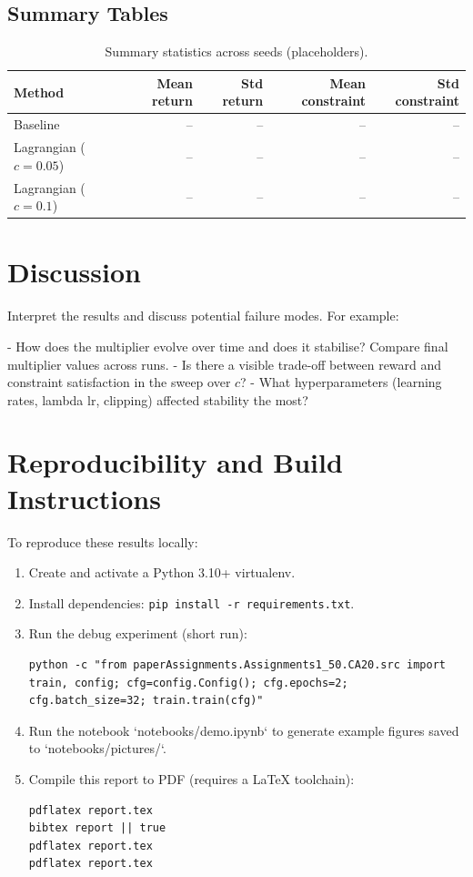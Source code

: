 \subsection{Summary Tables}
\begin{table}[h]
  \centering
  \begin{tabular}{lrrrr}
    \hline
    Method & Mean return & Std return & Mean constraint & Std constraint\\
    \hline
    Baseline & -- & -- & -- & -- \\
    Lagrangian ($c=0.05$) & -- & -- & -- & -- \\
    Lagrangian ($c=0.1$) & -- & -- & -- & -- \\
    \hline
  \end{tabular}
  \caption{Summary statistics across seeds (placeholders).}
  \label{tab:summary}
\end{table}

\section{Discussion}

Interpret the results and discuss potential failure modes. For example:

- How does the multiplier evolve over time and does it stabilise? Compare final multiplier values across runs.
- Is there a visible trade-off between reward and constraint satisfaction in the sweep over $c$?
- What hyperparameters (learning rates, lambda lr, clipping) affected stability the most?

\section{Reproducibility and Build Instructions}
\label{sec:repro}

To reproduce these results locally:

\begin{enumerate}
  \item Create and activate a Python 3.10+ virtualenv.
  \item Install dependencies: \texttt{pip install -r requirements.txt}.
  \item Run the debug experiment (short run):
  \begin{verbatim}
python -c "from paperAssignments.Assignments1_50.CA20.src import train, config; cfg=config.Config(); cfg.epochs=2; cfg.batch_size=32; train.train(cfg)"
  \end{verbatim}
  \item Run the notebook `notebooks/demo.ipynb` to generate example figures saved to `notebooks/pictures/`.
  \item Compile this report to PDF (requires a LaTeX toolchain):
  \begin{verbatim}
pdflatex report.tex
bibtex report || true
pdflatex report.tex
pdflatex report.tex
  \end{verbatim}
\end{enumerate}

